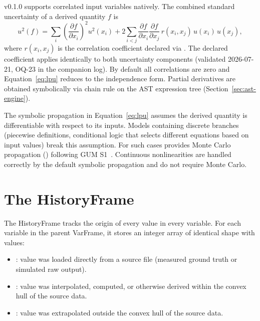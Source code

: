 \itc{} v0.1.0 supports correlated input variables natively. The combined
standard uncertainty of a derived quantity $f$ is
\begin{equation}
u^2(f) = \sum_i \left(\frac{\partial f}{\partial x_i}\right)^2 u^2(x_i)
       + 2\sum_{i<j} \frac{\partial f}{\partial x_i}
                     \frac{\partial f}{\partial x_j}
                     \,r(x_i, x_j)\, u(x_i)\, u(x_j),
\label{eq:lpu}
\end{equation}
where $r(x_i, x_j)$ is the correlation coefficient declared via
. The declared coefficient applies
identically to both uncertainty components (validated 2026-07-21,
OQ-23 in the companion log). By default all correlations are zero and
Equation~\eqref{eq:lpu} reduces to the independence form. Partial derivatives
are obtained symbolically via chain rule on the AST expression tree
(Section~\ref{sec:ast-engine}).

\begin{noteinfo}
The symbolic propagation in Equation~\eqref{eq:lpu} assumes the derived
quantity is differentiable with respect to its inputs. Models containing
discrete branches (piecewise definitions, conditional logic that selects different equations based on input values) break this assumption. For
such cases \itc{} provides Monte Carlo propagation
() following GUM
S1~\citep{gum2008s1}. Continuous nonlinearities are handled correctly by
the default symbolic propagation and do not require Monte Carlo.
\end{noteinfo}

\section{The HistoryFrame}

The HistoryFrame tracks the origin of every value in every variable. For
each variable in the parent VarFrame, it stores an integer array of
identical shape with values:

\begin{itemize}[noitemsep,topsep=2pt]
  \item {}: value was loaded directly from a source file (measured
    ground truth or simulated raw output).
  \item {}: value was interpolated, computed, or otherwise derived
    within the convex hull of the source data.
  \item {}: value was extrapolated outside the convex hull of the
    source data.
\end{itemize}

